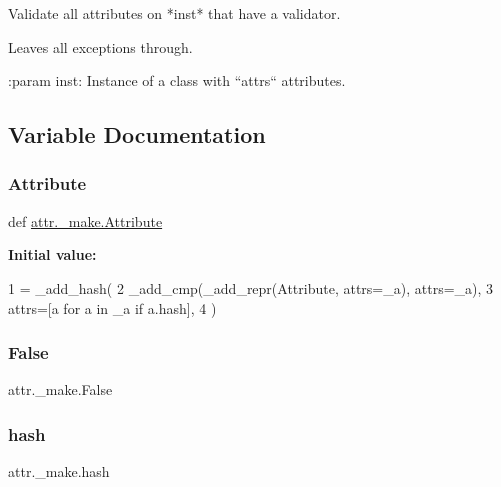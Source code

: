 \begin{DoxyVerb}Validate all attributes on *inst* that have a validator.

Leaves all exceptions through.

:param inst: Instance of a class with ``attrs`` attributes.
\end{DoxyVerb}
 

\subsection{Variable Documentation}
\mbox{\label{namespaceattr_1_1__make_ac510a4d2982a3b5968875d946197801c}} 
\subsubsection{\texorpdfstring{Attribute}{Attribute}}
{\footnotesize\ttfamily def \hyperlink{classattr_1_1__make_1_1_attribute}{attr.\+\_\+make.\+Attribute}}

{\bfseries Initial value\+:}
\begin{DoxyCode}
1 =  \_add\_hash(
2     \_add\_cmp(\_add\_repr(Attribute, attrs=\_a), attrs=\_a),
3     attrs=[a \textcolor{keywordflow}{for} a \textcolor{keywordflow}{in} \_a \textcolor{keywordflow}{if} a.hash],
4 )
\end{DoxyCode}
\mbox{\label{namespaceattr_1_1__make_a65fcd916433aa9a30f9711503366982e}} 
\subsubsection{\texorpdfstring{False}{False}}
{\footnotesize\ttfamily attr.\+\_\+make.\+False}

\mbox{\label{namespaceattr_1_1__make_a669b2aad68738f520370d3236455673b}} 
\subsubsection{\texorpdfstring{hash}{hash}}
{\footnotesize\ttfamily attr.\+\_\+make.\+hash}

